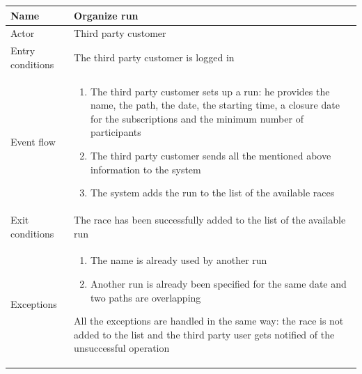 \begin{table}[H]
\begin{tabularx}{\textwidth}{|l|X|}
\hline
 Name & Organize run \\ \hline
 Actor & Third party customer \\ \hline
 Entry conditions & The third party customer is logged in\\ \hline
 Event flow & 
 \begin{enumerate}
 	\item The third party customer sets up a run: he provides the name, the path, the date, the starting time, a closure date for the subscriptions and the minimum number of participants
  	\item The third party customer sends all the mentioned above information to the system
 	\item The system adds the run to the list of the available races
 \end{enumerate}   \\ \hline
 Exit conditions & The race has been successfully added to the list of the available run \\ \hline
 Exceptions & 
 \begin{enumerate}
 	\item The name is already used by another run
 	\item Another run is already been specified for the same date and two paths are overlapping 
 \end{enumerate}  
 All the exceptions are handled in the same way: the race is not added to the list and the third party user gets notified of the unsuccessful operation 
 \\ \hline
\end{tabularx}
\end{table}


